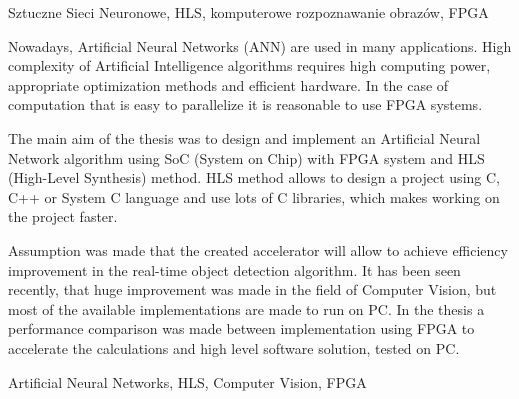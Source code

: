 \documentclass[
    left=2.5cm,         %
    right=2.5cm,        %
    top=2.5cm,          %
    bottom=3cm,         %
    bindingoffset=6mm,  %
    nohyphenation=false %
]{eiti/eiti-thesis}
\begin{document}
\slowakluczowe Sztuczne Sieci Neuronowe, HLS, komputerowe rozpoznawanie 
obrazów, FPGA

\cleardoublepage  %

\abstract
Nowadays, Artificial Neural Networks (ANN) are used in many applications. 
High complexity of Artificial Intelligence algorithms requires high 
computing power, appropriate optimization methods and efficient hardware. 
In the case of computation that is easy to parallelize it is reasonable 
to use FPGA systems.

The main aim of the thesis was to design and implement an Artificial 
Neural Network algorithm using SoC (System on Chip) with FPGA system 
and HLS (High-Level Synthesis) method. HLS method allows to design a 
project using C, C++ or System C language and use lots of C libraries, 
which makes working on the project faster.

Assumption was made that the created accelerator will allow to achieve 
efficiency improvement in the real-time object detection algorithm. 
It has been seen recently, that huge improvement was made in the field of 
Computer Vision, but most of the available implementations are made to 
run on PC. In the thesis a performance comparison was made between 
implementation using FPGA to accelerate the calculations and high level
software solution, tested on PC.

\keywords Artificial Neural Networks, HLS, Computer Vision, FPGA

\cleardoublepage  %
\pagestyle{plain}
\makeauthorship
\cleardoublepage %
\tableofcontents

\cleardoublepage %
\pagestyle{headings}



\end{document}
